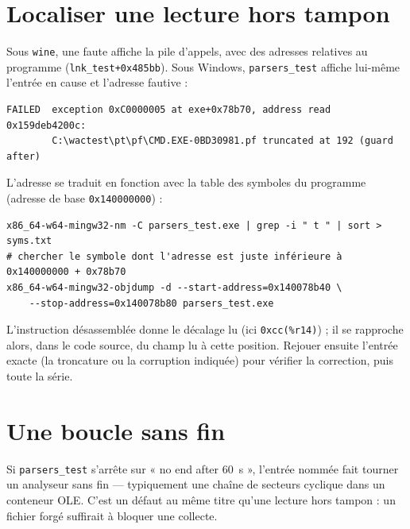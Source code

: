 \documentclass[11pt,a4paper,oneside]{report}
\begin{document}
\section{Localiser une lecture hors tampon}

Sous \texttt{wine}, une faute affiche la pile d'appels, avec des adresses
relatives au programme (\texttt{lnk\_test+0x485bb}). Sous Windows,
\texttt{parsers\_test} affiche lui-même l'entrée en cause et l'adresse fautive :

\begin{lstlisting}
FAILED  exception 0xC0000005 at exe+0x78b70, address read 0x159deb4200c:
        C:\wactest\pt\pf\CMD.EXE-0BD30981.pf truncated at 192 (guard after)
\end{lstlisting}

L'adresse se traduit en fonction avec la table des symboles du programme
(adresse de base \texttt{0x140000000}) :

\begin{lstlisting}
x86_64-w64-mingw32-nm -C parsers_test.exe | grep -i " t " | sort > syms.txt
# chercher le symbole dont l'adresse est juste inférieure à 0x140000000 + 0x78b70
x86_64-w64-mingw32-objdump -d --start-address=0x140078b40 \
    --stop-address=0x140078b80 parsers_test.exe
\end{lstlisting}

L'instruction désassemblée donne le décalage lu (ici \texttt{0xcc(\%r14)}) ; il
se rapproche alors, dans le code source, du champ lu à cette position. Rejouer
ensuite l'entrée exacte (la troncature ou la corruption indiquée) pour vérifier
la correction, puis toute la série.

\section{Une boucle sans fin}

Si \texttt{parsers\_test} s'arrête sur « no end after 60~s », l'entrée nommée
fait tourner un analyseur sans fin — typiquement une chaîne de secteurs cyclique
dans un conteneur OLE. C'est un défaut au même titre qu'une lecture hors tampon :
un fichier forgé suffirait à bloquer une collecte.
\end{document}
